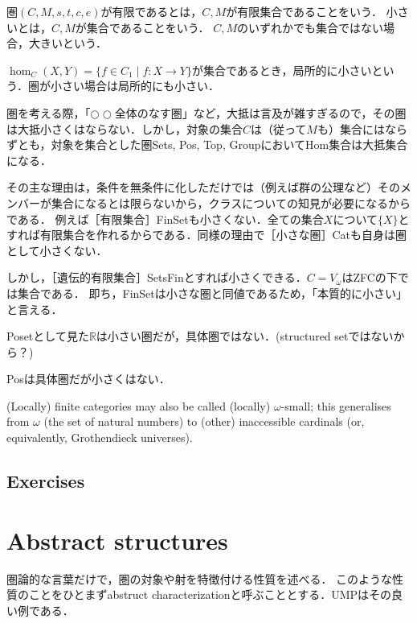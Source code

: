 \documentclass[uplatex, 12pt, dvipdfmx]{jsarticle}
\begin{document}
\begin{definition}
    圏$(C,M,s,t,c,e)$が有限であるとは，$C,M$が有限集合であることをいう．
    小さいとは，$C,M$が集合であることをいう．
    $C,M$のいずれかでも集合ではない場合，大きいという．
\end{definition}

\begin{definition}
    $\hom_C(X,Y)=\{ f\in C_1\mid f:X\to Y \}$が集合であるとき，局所的に小さいという．圏が小さい場合は局所的にも小さい．
\end{definition}
\begin{remark*}
    圏を考える際，「$\bigcirc\bigcirc$全体のなす圏」など，大抵は言及が雑すぎるので，その圏は大抵小さくはならない．しかし，対象の集合$C$は（従って$M$も）集合にはならずとも，対象を集合とした圏Sets, Pos, Top, GroupにおいてHom集合は大抵集合になる．

    その主な理由は，条件を無条件に化しただけでは（例えば群の公理など）そのメンバーが集合になるとは限らないから，クラスについての知見が必要になるからである．
    例えば［有限集合］FinSetも小さくない．全ての集合$X$について$\{X\}$とすれば有限集合を作れるからである．同様の理由で［小さな圏］Catも自身は圏として小さくない．

    しかし，［遺伝的有限集合］SetsFinとすれば小さくできる．$C=V_\omega$はZFCの下では集合である．
    即ち，FinSetは小さな圏と同値であるため，「本質的に小さい」と言える．
\end{remark*}


\begin{remark}
    Posetとして見た$\mathbb{R}$は小さい圏だが，具体圏ではない．(structured setではないから？)

    Posは具体圏だが小さくはない．
\end{remark}

\begin{remark*}
    (Locally) finite categories may also be called (locally) $\omega$-small; this generalises from $\omega$ (the set of natural numbers) to (other) inaccessible cardinals (or, equivalently, Grothendieck universes).
\end{remark*}

\subsection{Exercises}

\section{Abstract structures}
圏論的な言葉だけで，圏の対象や射を特徴付ける性質を述べる．
このような性質のことをひとまずabstruct characterizationと呼ぶこととする．UMPはその良い例である．
\end{document}
